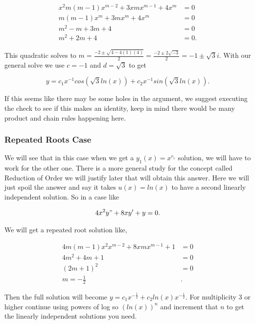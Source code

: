 \documentclass[12pt]{article}
\begin{document}
\begin{align*}
    x^2m(m-1)x^{m-2}+3xmx^{m-1}+4x^m &= 0 \\
    m(m-1)x^{m}+3mx^{m}+4x^m &= 0 \\
    m^2-m+3m+4 &= 0 \\
    m^2+2m+4 &= 0.
\end{align*}

This quadratic solves to $m=\frac{-2\pm \sqrt{4-4(1)(4)}}{2}=\frac{-2\pm 2\sqrt{-3}}{2}=-1\pm \sqrt{3}i$. With our general solve we use $c=-1$ and $d=\sqrt{3}$ to get

\begin{equation*}
    y=c_1 x^{-1} cos(\sqrt{3}ln(x)) + c_2 x^{-1} sin(\sqrt{3}ln(x)).
\end{equation*}

If this seems like there may be some holes in the argument, we suggest executing the check to see if this makes an identity, keep in mind there would be many product and chain rules happening here.

\subsubsection{Repeated Roots Case}

We will see that in this case when we get a $y_1(x)=x^{r_1}$ solution, we will have to work for the other one. There is a more general study for the concept called Reduction of Order we will justify later that will obtain this answer. Here we will just spoil the answer and say it takes $u(x)=ln(x)$ to have a second linearly independent solution. So in a case like

\begin{equation*}
    4x^2y"+8xy'+y=0.
\end{equation*}

We will get a repeated root solution like,

\begin{align*}
    4m(m-1)x^2x^{m-2}+8xmx^{m-1}+1&=0 \\
    4m^2+4m+1&=0 \\
    (2m+1)^2&=0 \\
    m = -\frac{1}{2}&.
\end{align*}

Then the full solution will become $y=c_1x^{-\frac{1}{2}}+c_2ln(x)x^{-\frac{1}{2}}$. For multiplicity 3 or higher continue using powers of log so $(ln(x))^n$ and increment that $n$ to get the linearly independent solutions you need.
\end{document}
